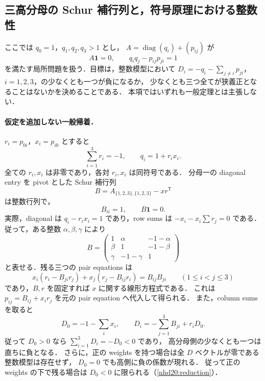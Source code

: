 \subsection{三高分母の Schur 補行列と，符号原理における整数性}
\label{nsch18:three-high}

ここでは $q_0=1$，$q_1,q_2,q_3>1$ とし，
$A=\operatorname{diag}(q_i)+(p_{ij})$ が
\[
 A\mathbf1=0,\qquad q_iq_j-p_{ij}p_{ji}=1
\]
を満たす局所問題を扱う．目標は，整数模型において
$D_i=-q_i-\sum_{j\ne i}p_{ji}$，$i=1,2,3$，の少なくとも一つが負になるか，
少なくとも三つ全てが狭義正となることはないかを決めることである．
本項ではいずれも一般定理とは主張しない．

\paragraph{仮定を追加しない一般帰着．}
$r_i=p_{0i}$，$x_i=p_{i0}$ とすると
\[
 \sum_{i=1}^3r_i=-1,\qquad q_i=1+r_ix_i.
\]
全ての $r_i,x_i$ は非零であり，各対 $r_i,x_i$ は同符号である．
分母一の diagonal entry を pivot とした Schur 補行列
\[
 B=A_{\{1,2,3\},\{1,2,3\}}-xr^{\mathsf T}
\]
は整数行列で，
\begin{equation}\label{nsch18:unit-diagonal}
 B_{ii}=1,\qquad B\mathbf1=0.
\end{equation}
実際，diagonal は $q_i-r_ix_i=1$ であり，row sums は
$-x_i-x_i\sum r_j=0$ である．従って，ある整数 $\alpha,\beta,\gamma$ により
\[
 B=\begin{pmatrix}
 1&\alpha&-1-\alpha\\
 \beta&1&-1-\beta\\
 \gamma&-1-\gamma&1
 \end{pmatrix}
\]
と表せる．残る三つの pair equations は
\begin{equation}\label{nsch18:linear-x}
 x_i(r_i-B_{ji}r_j)+x_j(r_j-B_{ij}r_i)=B_{ij}B_{ji}
 \qquad(1\leq i<j\leq3)
\end{equation}
であり，$B,r$ を固定すれば $x$ に関する線形方程式である．
これは $p_{ij}=B_{ij}+x_ir_j$ を元の pair equation へ代入して得られる．
また，column sums を取ると
\begin{equation}\label{nsch18:defect}
 D_0=-1-\sum_i x_i,\qquad
 D_i=-\sum_{j=1}^3B_{ji}+r_iD_0.
\end{equation}
従って $D_0>0$ なら $\sum_{i=1}^3D_i=-D_0<0$ であり，
高分母側の少なくとも一つは直ちに負となる．
さらに，正の weights を持つ場合は全 $D$ ベクトルが零である整数模型は存在せず，
$D_0=0$ でも高側に負の係数が現れる．
従って正の weights の下で残る場合は $D_0<0$ に限られる（\ref{nhd20:reduction}）．

